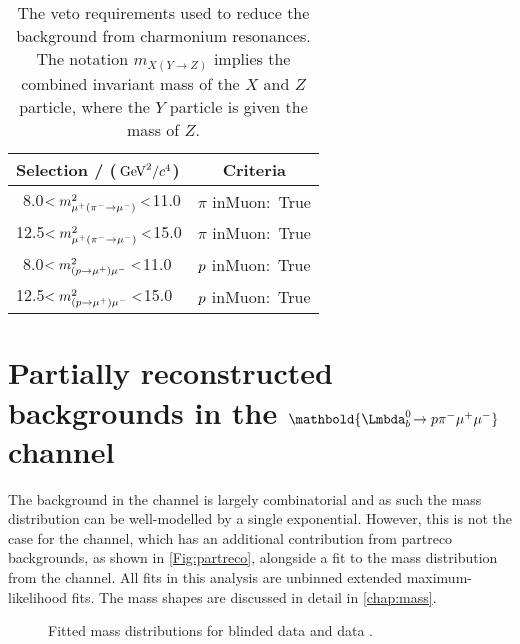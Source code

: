 \begin{table}
  \centering
  \begin{tabular}{ l | c }
    \hline
    Selection / ($\mathrm{\,Ge\kern -0.1em V}^{2}/c^{4}$) & Criteria \\
    \hline
    $\;\,$8.0$<m^{2}_{{\mu^+}({{\pi}^-}\rightarrow{\ensuremath{\mu^-}})}<$11.0 & $\pi$ inMuon$:$ True\\
    12.5$<m^{2}_{{\mu^+}({{\pi}^-}\rightarrow{\ensuremath{\mu^-}})}<$15.0 & $\pi$ inMuon$:$ True\\
    $\;\,$8.0$<m^{2}_{({p}\rightarrow{\ensuremath{\mu^+}}){\mu^-}}<$11.0 & ${p}$ inMuon$:$ True\\
    12.5$<m^{2}_{({p}\rightarrow{\ensuremath{\mu^+}}){\mu^-}}<$15.0 & ${p}$ inMuon$:$ True\\

    \hline
  \end{tabular}
  \caption{The veto requirements used to reduce the background from charmonium resonances. The notation $m_{X(Y\to Z)}$ implies the combined invariant mass of the $X$ and $Z$ particle, where the $Y$ particle is given the mass of $Z$.}
  \label{tab:muon}
\end{table}
\section[Partially reconstructed backgrounds in the $\Lbpi$ channel]{Partially reconstructed backgrounds in the $\mathbold{\Lbpi}$ channel}
\label{Sec:partreco}
The background in the \Lbpijpsi channel is largely combinatorial and as such the \Lbpijpsi mass distribution can be well-modelled by a single exponential. However, this is not the case for the \Lbpi channel, which has an additional contribution from \gls{partreco} backgrounds, as shown in \autoref{Fig:partreco}, alongside a fit to the mass distribution from the \LbK channel. All fits in this analysis are unbinned extended maximum-likelihood fits. The mass shapes are discussed in detail in \autoref{chap:mass}.
\begin{figure}[!ht]\def\nh{0.3\textwidth}
  \centering
    \caption{Fitted mass distributions for blinded \Lbpi data \protect{} and \LbK data \protect{}. }
  \label{Fig:partreco}
\end{figure}



